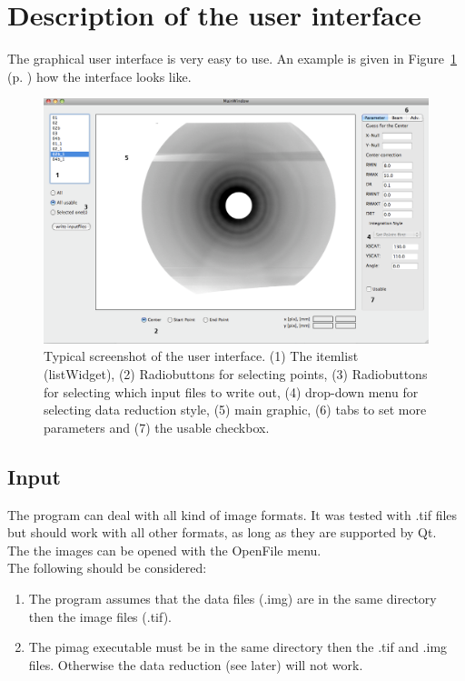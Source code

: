 \section{Description of the user interface} 
The graphical user interface is very easy to use. An example is given in Figure~\ref{ui} (p. \pageref{ui}) how the interface looks like. 

\begin{figure}
\includegraphics[width=20cm, angle=90]{ui.png}
\caption{Typical screenshot of the user interface. (1) The itemlist (listWidget), (2) Radiobuttons for selecting points, (3) Radiobuttons for selecting which input files to write out, (4) drop-down menu for selecting data reduction style, (5) main graphic, (6) tabs to set more parameters and (7) the usable checkbox. }
\label{ui} 
\end{figure} 

\subsection{Input}
The program can deal with all kind of image formats. It was tested with .tif files but should work with all other formats, as long as they are supported by Qt. \\
The the images can be opened with the OpenFile menu. \\
The following should be considered:
\begin{enumerate}
\item The program assumes that the data files (.img) are in the same directory then the image files (.tif). 
\item The pimag executable must be in the same directory then the .tif and .img files. Otherwise the data reduction (see later) will not work. 
\end{enumerate}

